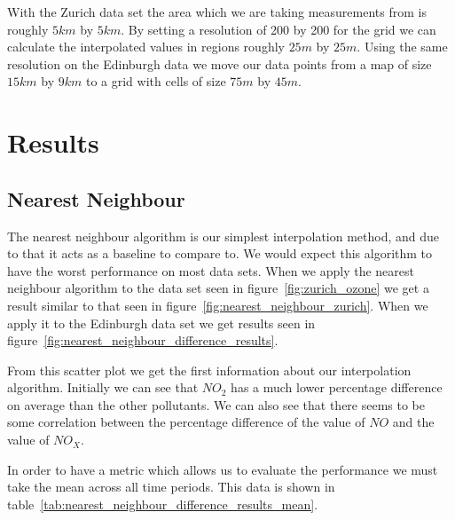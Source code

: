 			With the Zurich data set the area which we are taking measurements from is roughly $5km$ by $5km$. By setting a resolution of 200 by 200 for the grid we can calculate the interpolated values in regions roughly $25m$ by $25m$. Using the same resolution on the Edinburgh data we move our data points from a map of size $15km$ by $9km$ to a grid with cells of size $75m$ by $45m$. 


    \section{Results}\label{prediction_evaluation_results}

        \subsection{Nearest Neighbour}\label{prediction_evaluation_results_nearest_neighbour}


	        The nearest neighbour algorithm is our simplest interpolation method, and due to that it acts as a baseline to compare to. We would expect this algorithm to have the worst performance on most data sets. When we apply the nearest neighbour algorithm to the data set seen in figure~\ref{fig:zurich_ozone} we get a result similar to that seen in figure~\ref{fig:nearest_neighbour_zurich}. When we apply it to the Edinburgh data set we get results seen in figure~\ref{fig:nearest_neighbour_difference_results}. 


			From this scatter plot we get the first information about our interpolation algorithm. Initially we can see that $NO_{2}$ has a much lower percentage difference on average than the other pollutants. We can also see that there seems to be some correlation between the percentage difference of the value of $NO$ and the value of $NO_{X}$. 

			In order to have a metric which allows us to evaluate the performance we must take the mean across all time periods. This data is shown in table~\ref{tab:nearest_neighbour_difference_results_mean}. 

